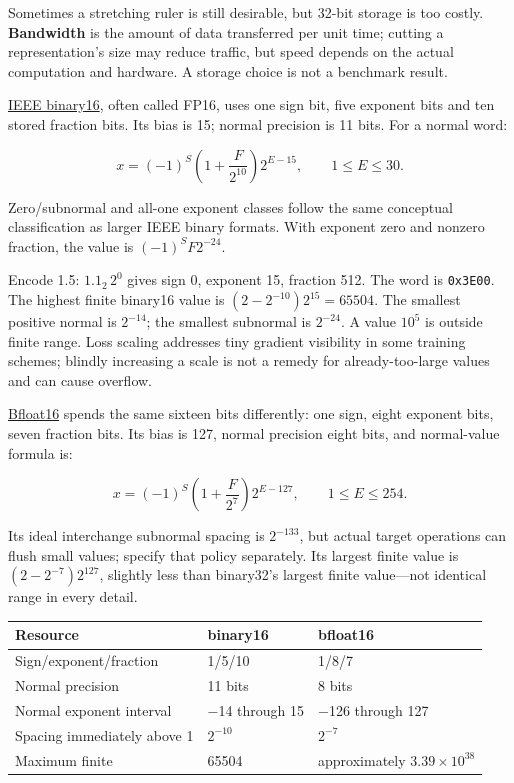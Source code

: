 \hypertarget{01-foundations-i-ch001-two-sixteen-bit-bargains-keep-detail-or-keep-range}{}

Sometimes a stretching ruler is still desirable, but 32-bit storage is too costly. \textbf{Bandwidth} is the amount of data transferred per unit time; cutting a representation's size may reduce traffic, but speed depends on the actual computation and hardware. A storage choice is not a benchmark result.

\hyperref[appendix-34443cec7170]{IEEE binary16}, often called FP16, uses one sign bit, five exponent bits and ten stored fraction bits. Its bias is 15; normal precision is 11 bits. For a normal word:

\[
x=(-1)^S\left(1+\frac{F}{2^{10}}\right)2^{E-15},
\qquad 1\le E\le30.
\]

Zero/subnormal and all-one exponent classes follow the same conceptual classification as larger IEEE binary formats. With exponent zero and nonzero fraction, the value is \((-1)^SF2^{-24}\).

Encode 1.5: \(1.1_2\,2^0\) gives sign 0, exponent 15, fraction 512. The word is \texttt{0x3E00}. The highest finite binary16 value is \((2-2^{-10})2^{15}=65504\). The smallest positive normal is \(2^{-14}\); the smallest subnormal is \(2^{-24}\). A value \(10^5\) is outside finite range. Loss scaling addresses tiny gradient visibility in some training schemes; blindly increasing a scale is not a remedy for already-too-large values and can cause overflow.

\hyperref[appendix-18b8dd966b5d]{Bfloat16} spends the same sixteen bits differently: one sign, eight exponent bits, seven fraction bits. Its bias is 127, normal precision eight bits, and normal-value formula is:

\[
x=(-1)^S\left(1+\frac{F}{2^7}\right)2^{E-127},
\qquad1\le E\le254.
\]

Its ideal interchange subnormal spacing is \(2^{-133}\), but actual target operations can flush small values; specify that policy separately. Its largest finite value is \((2-2^{-7})2^{127}\), slightly less than binary32's largest finite value---not identical range in every detail.

{\def\LTcaptype{none} %
\begin{longtable}[]{@{}lll@{}}
\toprule\noalign{}
Resource & binary16 & bfloat16 \\
\midrule\noalign{}
\endhead
\bottomrule\noalign{}
\endlastfoot
Sign/exponent/fraction & 1/5/10 & 1/8/7 \\
Normal precision & 11 bits & 8 bits \\
Normal exponent interval & −14 through 15 & −126 through 127 \\
Spacing immediately above 1 & \(2^{-10}\) & \(2^{-7}\) \\
Maximum finite & 65504 & approximately \(3.39\times10^{38}\) \\
\end{longtable}
}

